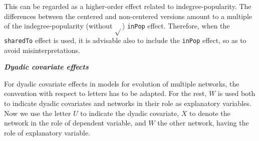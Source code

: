 \documentclass[a4paper,fleqn,11pt]{article}
\newcommand{\+}{\, + \,}
\newcounter{savenumi}
\begin{document}
\begin{enumerate}
 This can be regarded as a higher-order effect related to indegree-popularity.
 The differences between the centered and non-centered versions amount to
 a multiple of the indegree-popularity (without $\sqrt{}$) \texttt{inPop} effect.
 Therefore, when the \texttt{sharedTo} effect is used, it is advisable
 also to include the \texttt{inPop} effect, so as to avoid misinterpretations.
\setcounter{savenumi}{\value{enumi}}
\end{enumerate}

\iffalse

\noindent
\textbf{\emph{Dyadic covariate effects}}
\medskip

For dyadic covariate effects in models for evolution of multiple networks,
the convention with respect to letters has to be adapted.
For the rest, $W$ is used both to indicate dyadic covariates and networks
in their role as explanatory variables.
Now we use the letter $U$ to indicate the dyadic covariate,
$X$ to denote the network in the role of dependent variable, and $W$
the other network, having the role of explanatory variable.
\end{document}
